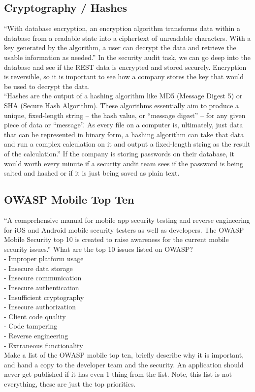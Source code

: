 \documentclass{article}
\begin{document}
\subsection{Cryptography / Hashes}
“With database encryption, an encryption algorithm transforms data within a database from a readable state into a ciphertext of unreadable characters. With a key generated by the algorithm, a user can decrypt the data and retrieve the usable information as needed.” In the security audit task, we can go deep into the database and see if the REST data is encrypted and stored securely. Encryption is reversible, so it is important to see how a company stores the key that would be used to decrypt the data.\\
“Hashes are the output of a hashing algorithm like MD5 (Message Digest 5) or SHA (Secure Hash Algorithm). These algorithms essentially aim to produce a unique, fixed-length string – the hash value, or “message digest” – for any given piece of data or “message”. As every file on a computer is, ultimately, just data that can be represented in binary form, a hashing algorithm can take that data and run a complex calculation on it and output a fixed-length string as the result of the calculation.” If the company is storing passwords on their database, it would worth every minute if a security audit team sees if the password is being salted and hashed or if it is just being saved as plain text.\\
\vspace{100mm}
\subsection{OWASP Mobile Top Ten}
“A comprehensive manual for mobile app security testing and reverse engineering for iOS and Android mobile security testers as well as developers. The OWASP Mobile Security top 10 is created to raise awareness for the current mobile security issues.” What are the top 10 issues listed on OWASP?\\
-	Improper platform usage\\
-	Insecure data storage\\
-	Insecure communication\\
-	Insecure authentication \\
-	Insufficient cryptography\\
-	Insecure authorization\\
-	Client code quality\\
-	Code tampering\\
-	Reverse engineering\\
-	Extraneous functionality\\
Make a list of the OWASP mobile top ten, briefly describe why it is important, and hand a copy to the developer team and the security. An application should never get published if it has even 1 thing from the list. Note, this list is not everything, these are just the top priorities.\\
\end{document}
